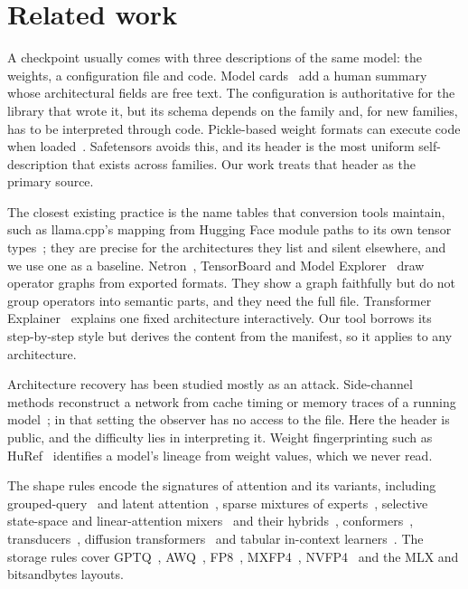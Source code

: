 \documentclass[11pt]{article}
\begin{document}
\section{Related work}
\label{sec:related}

A checkpoint usually comes with three descriptions of the same model: the weights, a configuration file and code. Model cards~\citep{mitchell2019modelcards} add a human summary whose architectural fields are free text. The configuration is authoritative for the library that wrote it, but its schema depends on the family and, for new families, has to be interpreted through code. Pickle-based weight formats can execute code when loaded~\citep{zhao2024modelsarecodes}. Safetensors avoids this, and its header is the most uniform self-description that exists across families. Our work treats that header as the primary source.

The closest existing practice is the name tables that conversion tools maintain, such as llama.cpp's mapping from Hugging Face module paths to its own tensor types~\citep{llamacpp}; they are precise for the architectures they list and silent elsewhere, and we use one as a baseline. Netron~\citep{netron}, TensorBoard and Model Explorer~\citep{modelexplorer2024} draw operator graphs from exported formats. They show a graph faithfully but do not group operators into semantic parts, and they need the full file. Transformer Explainer~\citep{cho2024transformerexplainer} explains one fixed architecture interactively. Our tool borrows its step-by-step style but derives the content from the manifest, so it applies to any architecture.

Architecture recovery has been studied mostly as an attack. Side-channel methods reconstruct a network from cache timing or memory traces of a running model~\citep{yan2020cachetelepathy,hu2020deepsniffer}; in that setting the observer has no access to the file. Here the header is public, and the difficulty lies in interpreting it. Weight fingerprinting such as HuRef~\citep{zeng2024huref} identifies a model's lineage from weight values, which we never read.

The shape rules encode the signatures of attention and its variants, including grouped-query~\citep{ainslie2023gqa} and latent attention~\citep{deepseekv2}, sparse mixtures of experts~\citep{shazeer2017moe,fedus2022switch}, selective state-space and linear-attention mixers~\citep{gu2023mamba,dao2024mamba2,yang2025gateddeltanet} and their hybrids~\citep{nemotronh2025}, conformers~\citep{gulati2020conformer,rekesh2023fastconformer}, transducers~\citep{graves2012rnnt,xu2023tdt}, diffusion transformers~\citep{peebles2023dit} and tabular in-context learners~\citep{hollmann2025tabpfn,qu2025tabicl}. The storage rules cover GPTQ~\citep{frantar2023gptq}, AWQ~\citep{lin2024awq}, FP8~\citep{micikevicius2022fp8}, MXFP4~\citep{rouhani2023mx}, NVFP4~\citep{nvidia2025nvfp4} and the MLX and bitsandbytes layouts.
\end{document}
